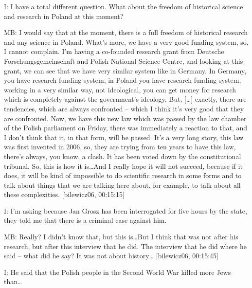 I: I have a total different question. What about the freedom of historical science and research in Poland at this moment? 

MB: I would say that at the moment, there is a full freedom of historical research and any science in Poland. What’s more, we have a very good funding system, so, I cannot complain. I’m having a co-founded research grant from Deutsche Forschungsgemeinschaft and Polish National Science Centre, and looking at this grant, we can see that we have very similar system like in Germany. In Germany, you have research funding system, in Poland you have research funding system, working in a very similar way, not ideological, you can get money for research which is completely against the government’s ideology. But, […] exactly, there are tendencies, which are always confronted – which I think it’s very good that they are confronted. Now, we have this new law which was passed by the law chamber of the Polish parliament on Friday, there was immediately a reaction to that, and I don’t think that it, in that form, will be passed. It’s a very long story, this law was first invented in 2006, so, they are trying from ten years to have this law, there’s always, you know, a clash. It has been voted down by the constitutional tribunal. So, this is how it is…And I really hope it will not succeed, because if it does, it will be kind of impossible to do scientific research in some forms and to talk about things that we are talking here about, for example, to talk about all these complexities. [bilewicz06, 00:15:15] 

I: I’m asking because Jan Grosz has been interrogated for five hours by the state, they told me that there is a criminal case against him. 

MB: Really? I didn’t know that, but this is…But I think that was not after his research, but after this interview that he did. The interview that he did where he said – what did he say? It was not about history… [bilewicz06, 00:15:45] 

I: He said that the Polish people in the Second World War killed more Jews than… 

